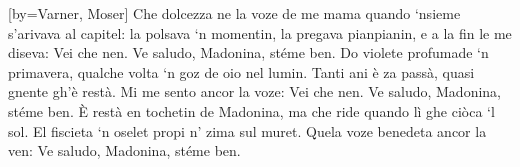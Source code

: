 [by={Varner, Moser}]
\chordsoff
\beginverse
Che dolcezza ne la voze de me mama 
quando ‘nsieme s'arivava al capitel: 
la polsava ‘n momentin, 
la pregava pianpianin, 
e a la fin le me diseva: Vei che nen. 
Ve saludo, Madonina, stéme ben. 
\endverse
\beginverse
Do violete profumade ‘n primavera, 
qualche volta ‘n goz de oio nel lumin. 
Tanti ani è za passà, 
quasi gnente gh'è restà. 
Mi me sento ancor la voze: Vei che nen. 
Ve saludo, Madonina, stéme ben. 
\endverse
\beginverse
È restà en tochetin de Madonina, 
ma che ride quando lì ghe ciòca ‘l sol. 
El fiscieta ‘n oselet 
propi n' zima sul muret. 
Quela voze benedeta ancor la ven: 
Ve saludo, Madonina, stéme ben.
\endverse
\endsong
